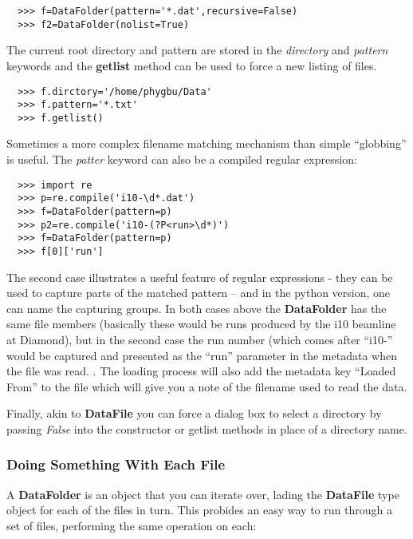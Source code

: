 \documentclass[a4paper,11pt]{scrartcl}
\begin{document}
\begin{verbatim}
  >>> f=DataFolder(pattern='*.dat',recursive=False)
  >>> f2=DataFolder(nolist=True)
\end{verbatim}

The current root directory and pattern are stored in the \textit{directory} and \textit{pattern} keywords and the \textbf{getlist} method can be used to force a new listing of files.

\begin{verbatim}
  >>> f.dirctory='/home/phygbu/Data'
  >>> f.pattern='*.txt'
  >>> f.getlist()
\end{verbatim}

Sometimes a more complex filename matching mechanism than simple ``globbing'' is useful. The \textit{patter} keyword can also be a compiled regular expression:

\begin{verbatim}
  >>> import re
  >>> p=re.compile('i10-\d*.dat')
  >>> f=DataFolder(pattern=p)
  >>> p2=re.compile('i10-(?P<run>\d*)')
  >>> f=DataFolder(pattern=p)
  >>> f[0]['run']
\end{verbatim}

The second case illustrates a useful feature of regular expressions - they can be used to capture parts of the matched pattern -- and in the python version, one can name the capturing groups. In both cases above the \textbf{DataFolder} has the same file members (basically these would be runs produced by the i10 beamline at Diamond), but in the second case the run number (which comes after ``i10-'' would be captured and presented as the ``run'' parameter in the metadata when the file was read. . The loading process will also add the metadata key ``Loaded From'' to the file which will give you a note of the filename used to read the data.

Finally, akin to \textbf{DataFile} you can force a dialog box to select a directory by passing \textit{False} into the constructor or getlist methods in place of a directory name.

\subsubsection{Doing Something With Each File}

A \textbf{DataFolder} is an object that you can iterate over, lading the \textbf{DataFile} type object for each of the files in turn. This probides an easy way to run through a set of files, performing the same operation on each:
\end{document}
